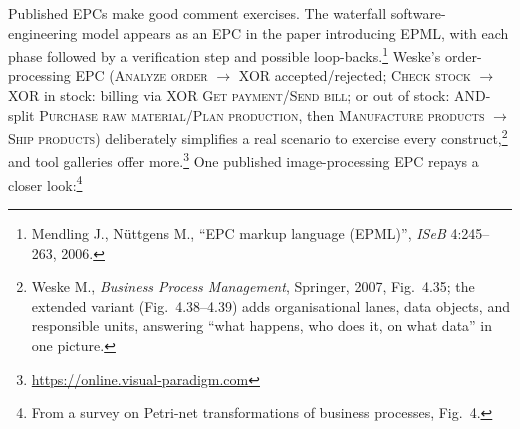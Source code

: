 Published EPCs make good comment exercises. The waterfall software-engineering model appears as an EPC in the paper introducing EPML, with each phase followed by a verification step and possible loop-backs.\footnote{Mendling J., N\"uttgens M., ``EPC markup language (EPML)'', \emph{ISeB} 4:245--263, 2006.} Weske's order-processing EPC (\textsc{Analyze order} $\to$ XOR accepted/rejected; \textsc{Check stock} $\to$ XOR in stock: billing via XOR \textsc{Get payment}/\textsc{Send bill}; or out of stock: AND-split \textsc{Purchase raw material}/\textsc{Plan production}, then \textsc{Manufacture products} $\to$ \textsc{Ship products}) deliberately simplifies a real scenario to exercise every construct,\footnote{Weske M., \emph{Business Process Management}, Springer, 2007, Fig.~4.35; the extended variant (Fig.~4.38--4.39) adds organisational lanes, data objects, and responsible units, answering ``what happens, who does it, on what data'' in one picture.} and tool galleries offer more.\footnote{\url{https://online.visual-paradigm.com}} One published image-processing EPC repays a closer look:\footnote{From a survey on Petri-net transformations of business processes, Fig.~4.}
